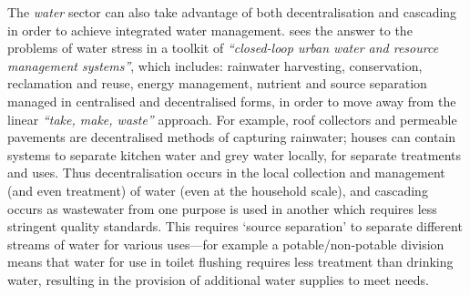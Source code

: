 The \emph{water} sector can also take advantage of both decentralisation and cascading in order to achieve integrated water management. \citet[p. 809]{Daigger2009} sees the answer to the problems of water stress in a toolkit of \emph{``closed-loop urban water and resource management systems''}, which includes: rainwater harvesting, conservation, reclamation and reuse, energy management, nutrient and source separation managed in centralised and decentralised forms, in order to move away from the linear \emph{``take, make, waste''} approach. For example, roof collectors and permeable pavements are decentralised methods of capturing rainwater; houses can contain systems to separate kitchen water and grey water locally, for separate treatments and uses. Thus decentralisation occurs in the local collection and management (and even treatment) of water (even at the household scale), and cascading occurs as wastewater from one purpose is used in another which requires less stringent quality standards. This requires `source separation' to separate different streams of water for various uses---for example a potable/non-potable division means that water for use in toilet flushing requires less treatment than drinking water, resulting in the provision of additional water supplies to meet needs.


